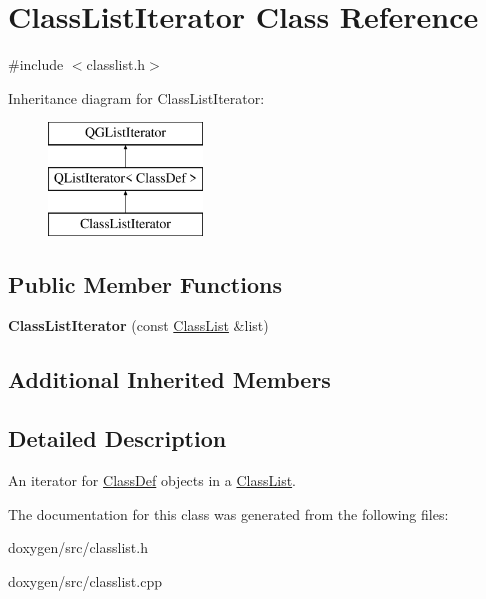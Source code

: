 \hypertarget{class_class_list_iterator}{}\section{Class\+List\+Iterator Class Reference}
\label{class_class_list_iterator}


{\ttfamily \#include $<$classlist.\+h$>$}

Inheritance diagram for Class\+List\+Iterator\+:\begin{figure}[H]
\begin{center}
\leavevmode
\includegraphics[height=3.000000cm]{class_class_list_iterator}
\end{center}
\end{figure}
\subsection*{Public Member Functions}
\begin{DoxyCompactItemize}
\item 
\mbox{\label{class_class_list_iterator_acfe9686c7b01cfc4cc9ef5f1d308db92}} 
{\bfseries Class\+List\+Iterator} (const \mbox{\hyperlink{class_class_list}{Class\+List}} \&list)
\end{DoxyCompactItemize}
\subsection*{Additional Inherited Members}


\subsection{Detailed Description}
An iterator for \mbox{\hyperlink{class_class_def}{Class\+Def}} objects in a \mbox{\hyperlink{class_class_list}{Class\+List}}. 

The documentation for this class was generated from the following files\+:\begin{DoxyCompactItemize}
\item 
doxygen/src/classlist.\+h\item 
doxygen/src/classlist.\+cpp\end{DoxyCompactItemize}
